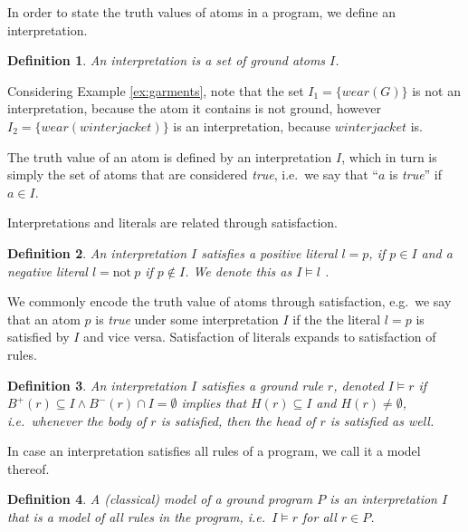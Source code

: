\documentclass{vutinfth} %
\newtheorem{definition}{Definition}[chapter]
\newcommand{\headf}{H}
\newcommand{\bodyf}{B}
\newcommand{\fail}{\mathrm{not } \ \xspace}
\begin{document}
In order to state the truth values of atoms in a program, we define an interpretation.

\begin{definition}
An \emph{interpretation} is a set of ground atoms $I$.
\end{definition}


Considering Example \ref{ex:garments}, note that the set $I_1 = \{ wear(G) \}$ is not an interpretation, because the atom it contains is not ground, however $I_2 = \{ wear(winterjacket) \}$ is an interpretation, because $winterjacket$ is.

The truth value of an atom is defined by an interpretation $I$, which in turn is simply the set of atoms that are considered \emph{true}, i.e.~we say that \enquote{$a$ is \emph{true}} if $a \in I$.

Interpretations and literals are related through satisfaction.

\begin{definition}
An interpretation $I$ \emph{satisfies} a positive literal $l = p$, if $p \in I$ and a negative literal $l = \fail p$ if $p \not \in I$. We denote this as $I \models l$ .
\end{definition}

We commonly encode the truth value of atoms through satisfaction, e.g.~we say that an atom $p$ is \emph{true} under some interpretation $I$ if the the literal $l = p$ is satisfied by $I$ and vice versa. Satisfaction of literals expands to satisfaction of rules.%

\begin{definition}
\label{def:rule-model}
An interpretation $I$ \emph{satisfies} a ground rule $r$, denoted $I \models r$ if $\bodyf^+(r) \subseteq I \wedge \bodyf^-(r) \cap I = \emptyset$ implies that $\headf(r) \subseteq I$ and $\headf(r) \not = \emptyset$, i.e.~whenever the body of $r$ is satisfied, then the head of $r$ is satisfied as well.
\end{definition}

In case an interpretation satisfies all rules of a program, we call it a model thereof.

\begin{definition}
A \emph{(classical) model} of a ground program $P$ is an interpretation $I$ that is a model of all rules in the program, i.e.~$I \models r$ for all $r \in P$.
\end{definition}
\end{document}
